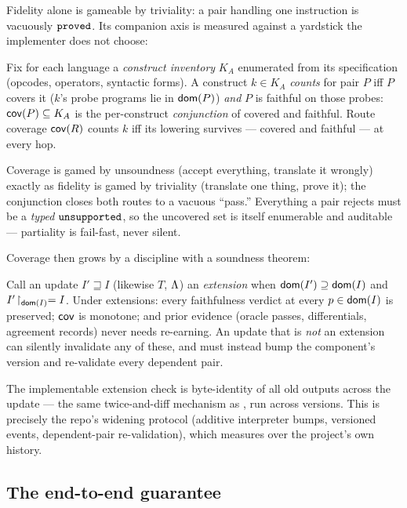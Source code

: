 Fidelity alone is gameable by triviality: a pair handling one instruction
is vacuously $\mathtt{proved}$. Its companion axis is measured against a yardstick
the implementer does not choose:

\begin{definition}[Coverage]
\label{def:coverage}
Fix for each language a \emph{construct inventory} $K_A$ enumerated from
its specification (opcodes, operators, syntactic forms). A construct
$k \in K_A$ \emph{counts} for pair $P$ iff $P$ covers it
($k$'s probe programs lie in $\mathsf{dom}(P)$) \emph{and} $P$ is faithful on
those probes: $\mathsf{cov}(P) \subseteq K_A$ is the per-construct
\emph{conjunction} of covered and faithful. Route coverage $\mathsf{cov}(R)$
counts $k$ iff its lowering survives --- covered and faithful --- at every
hop.
\end{definition}

Coverage is gamed by unsoundness (accept everything, translate it
wrongly) exactly as fidelity is gamed by triviality (translate one thing,
prove it); the conjunction closes both routes to a vacuous ``pass.''
Everything a pair rejects must be a \emph{typed} $\mathtt{unsupported}$, so the
uncovered set is itself enumerable and auditable --- partiality is
fail-fast, never silent.

Coverage then grows by a discipline with a soundness theorem:

\begin{proposition}[Ratchet]
\label{prop:ratchet}
Call an update $I' \sqsupseteq I$ (likewise $T$, $\Lambda$) an
\emph{extension} when $\mathsf{dom}(I') \supseteq \mathsf{dom}(I)$ and
$I'\!\restriction_{\mathsf{dom}(I)} = I$. Under extensions: every faithfulness
verdict at every $p \in \mathsf{dom}(I)$ is preserved; $\mathsf{cov}$ is monotone; and
prior evidence (oracle passes, differentials, agreement records) never
needs re-earning. An update that is \emph{not} an extension can silently
invalidate any of these, and must instead bump the component's version
and re-validate every dependent pair.
\end{proposition}

The implementable extension check is byte-identity of all old outputs
across the update --- the same twice-and-diff mechanism as
, run across versions. This is precisely the repo's
widening protocol (additive interpreter bumps, versioned events,
dependent-pair re-validation), which  measures over
the project's own history.

\subsection{The end-to-end guarantee}
\label{sec:endtoend}

